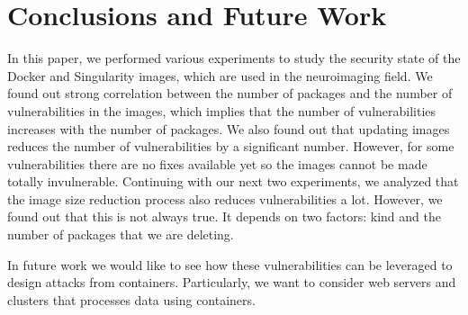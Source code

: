 \documentclass[a4paper,num-refs]{oup-contemporary}
\begin{document}
\section{Conclusions and Future Work}

In this paper, we performed various experiments to study the security state of the Docker
and Singularity images, which are used in the neuroimaging field. We found out strong correlation
between the number of packages and the number of vulnerabilities in the images, which implies
that the number of vulnerabilities increases with the number of packages. We also found out that
updating images reduces the number of vulnerabilities by a significant number. However, for some
vulnerabilities there are no fixes available yet so the images cannot 
be made totally invulnerable. Continuing with our next two experiments, we analyzed that the
image size reduction process also reduces vulnerabilities a lot. However, we found out that this is not
always true. It depends on two factors: kind and the number of packages that we are
deleting.

In future work we would like to see how these vulnerabilities can be leveraged
to design attacks from containers. Particularly, we want
to consider web servers and clusters that processes data using containers.


\end{document}
